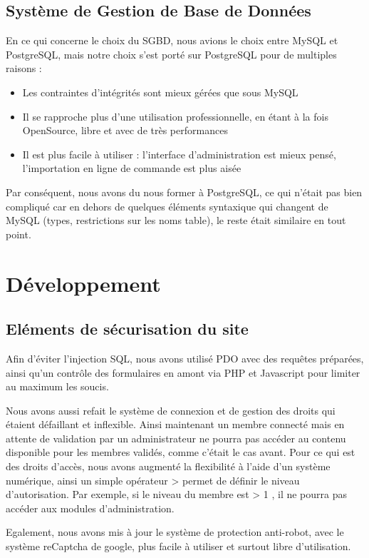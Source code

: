 \documentclass[11pt]{report}
\begin{document}
\subsection{Système de Gestion de Base de Données}
En ce qui concerne le choix du SGBD, nous avions le choix entre MySQL et
PostgreSQL, mais notre choix s'est porté sur PostgreSQL pour de multiples
raisons : \\
\begin{itemize}
  \item Les contraintes d'intégrités sont mieux gérées que sous MySQL
  \item Il se rapproche plus d'une utilisation professionnelle, en étant à la
  fois OpenSource, libre et avec de très performances
  \item Il est plus facile à utiliser : l'interface d'administration est mieux
  pensé, l'importation en ligne de commande est plus aisée \\
\end{itemize}

\par Par conséquent, nous avons du nous former à PostgreSQL, ce qui n'était pas
bien compliqué car en dehors de quelques éléments syntaxique qui changent de
MySQL (types, restrictions sur les noms table), le reste était similaire en tout
point.

\section{Développement}

\subsection{Eléments de sécurisation du site}
Afin d'éviter l'injection SQL, nous avons utilisé PDO avec des requêtes
préparées, ainsi qu'un contrôle des formulaires en amont via PHP et Javascript
pour limiter au maximum les soucis. \\
\par Nous avons aussi refait le système de connexion et de gestion des droits
qui étaient défaillant et inflexible. Ainsi maintenant un membre connecté mais
en attente de validation par un administrateur ne pourra pas accéder au contenu
disponible pour les membres validés, comme c'était le cas avant. Pour ce qui est
des droits d'accès, nous avons augmenté la flexibilité à l'aide d'un système
numérique, ainsi un simple opérateur \og > \fg{} permet de définir le niveau
d'autorisation. Par exemple, si le niveau du membre est \og > 1 \fg{}, il ne
pourra pas accéder aux modules d'administration. \\
 \par Egalement, nous avons mis à jour le système de protection anti-robot, avec
 le système reCaptcha de google, plus facile à utiliser et surtout libre 
 d'utilisation.
 
\end{document}

